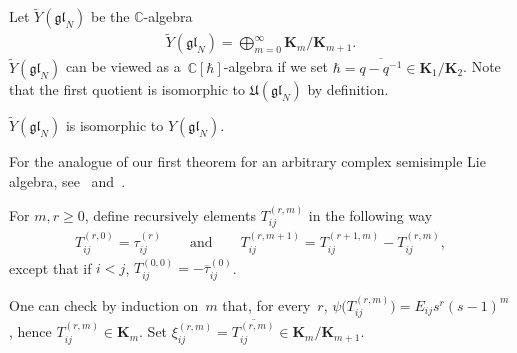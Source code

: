 Let $\widetilde{Y}(\mathfrak{gl}_N)$ be the $\mathbb{C}$-algebra
\begin{gather*}
\widetilde{Y}(\mathfrak{gl}_N) = \bigoplus_{m=0}^{\infty} \mathbf{K}_{m}/\mathbf{K}_{m+1}.
\end{gather*}
$\widetilde{Y}(\mathfrak{gl}_N)$ can be viewed as a~$\mathbb{C}[\hbar]$-algebra if we set
$\hbar=\overline{q-q^{-1}} \in \mathbf{K}_1/\mathbf{K}_2$.
Note that the f\/irst quotient is isomorphic to $\mathfrak{U}(\mathfrak{gl}_N)$ by def\/inition.

\begin{theorem}
\label{mainthm}
$ \widetilde{Y}(\mathfrak{gl}_N)$ is isomorphic to $Y(\mathfrak{gl}_N)$.
\end{theorem}

For the analogue of our f\/irst theorem for an arbitrary complex semisimple Lie algebra, see~\cite{Dr1} and~\cite{GuMa}.

For $m,r\ge 0$, def\/ine recursively elements $T_{ij}^{(r,m)}$ in the following way
\begin{gather*}
T_{ij}^{(r,0)} = \tau_{ij}^{(r)} \qquad\text{and}\qquad T_{ij}^{(r,m+1)} = T_{ij}^{(r+1,m)} - T_{ij}^{(r,m)},
\end{gather*}
except that if $i<j$, $T_{ij}^{(0,0)} = -\overline{\tau}_{ij}^{(0)}$.

{\sloppy One can check by induction on~$m$ that, for every~$r$, $\psi\big(T_{ij}^{(r,m)}\big)=E_{ij}s^r(s-1)^m$, hence $T_{ij}^{(r,m)}
\in \mathbf{K}_m$.
Set $\xi_{ij}^{(r,m)} = \overline{T_{ij}^{(r,m)}} \in \mathbf{K}_m/\mathbf{K}_{m+1}$.

}


